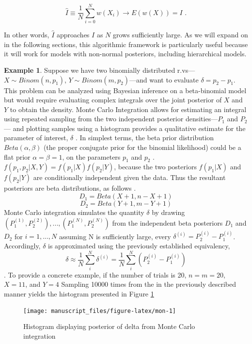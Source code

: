 \documentclass[
  12pt,
]{book}
\theoremstyle{definition}
\theoremstyle{definition}
\newtheorem{example}{Example}[chapter]
\theoremstyle{definition}
\theoremstyle{remark}
\begin{document}
\[\hat{I}\equiv\frac{1}{N}\sum_{i=0}^{N}w(X_{i})\rightarrow E(w(X))=I \textrm{ .}\]

In other words, \(\hat{I}\) approaches \(I\) as \(N\) grows sufficiently large.
As we will expand on in the following sections, this algorithmic framework is particularly useful because it will work for models with non-normal posteriors, including hierarchical models.

\begin{example}
\protect\hypertarget{exm:montecarl}{}{\label{exm:montecarl} }Suppose we have two binomially distributed r.vs---\(X \sim Binom(n,p_1)\), \(Y \sim Binom(m,p_2)\)---and want to evaluate \(\delta = p_2 - p_1\).
This problem can be analyzed using Bayesian inference on a beta-binomial model but would require evaluating complex integrals over the joint posterior of \(X\) and \(Y\) to obtain the density.
Monte Carlo Integration allows for estimating an integral using repeated sampling from the two independent posterior densities---\(P_1\) and \(P_2\)--- and plotting samples using a histogram provides a qualitative estimate for the parameter of interest, \(\delta\) \citep{Wasserman2004}.
In simplest terms, the beta prior distribution \(Beta(\alpha, \beta)\) (the proper conjugate prior for the binomial likelihood) could be a flat prior \(\alpha = \beta = 1\), on the parameters \(p_1\) and \(p_2\) \citep{Bloom2014}.
\(f(p_1,p_2|X,Y)=f(p_1|X)f(p_2|Y)\), because the two posteriors \(f(p_1|X)\) and \(f(p_2|Y)\) are conditionally independent given the data.
Thus the resultant posteriors are beta distributions, as follows \citep{Bloom2014}.
\[D_1 = Beta(X+1,n-X+1)\]
\[D_2 = Beta(Y+1,m-Y+1)\]
Monte Carlo integration simulates the quantity \(\delta\) by drawing \((P_1^{(1)},P_2^{(2)}),...,(P_1^{(N)},P_2^{(N)})\) from the independent beta posteriors \(D_1\) and \(D_2\) for \(i=1,...,N\) assuming N is sufficiently large, every \(\delta^{(i)}=P_2^{(i)} - P_1^{(i)}\).
Accordingly, \(\delta\) is approximated using the previously established equivalency, \[\delta \approx \frac{1}{N} \sum_i^N \delta^{(i)} = \frac{1}{N} \sum_i^N (P_2^{(i)} - P_1^{(i)})\] \citep{Wasserman2004}.
To provide a concrete example, if the number of trials is 20, \(n=m=20\), \(X = 11\), and \(Y = 4\) Sampling 10000 times from the in the previously described manner yields the histogram presented in Figure \ref{fig:mon}
\end{example}

\begin{figure}

{\centering \texttt{[image: manuscript\_files/figure-latex/mon-1]} 

}

\caption{Histogram displaying posterior of delta from Monte Carlo integration}\label{fig:mon}
\end{figure}
\end{document}
